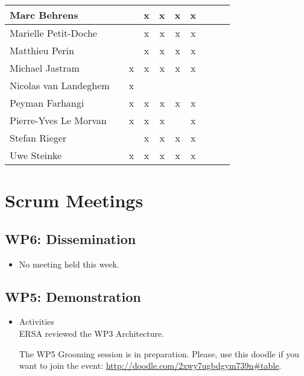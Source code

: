 \documentclass[a4paper, 11pt]{article}
\begin{document}
\begin{tabular}{|l|c|c|c||c|c|c||c|c|c|}
Marc Behrens         &   &   & x & x & x & x \\\hline
Marielle Petit-Doche &   &   & x & x & x & x \\\hline
Matthieu Perin       &   &   & x & x & x & x \\\hline
Michael Jastram      &   & x & x & x & x & x \\\hline
Nicolas van Landeghem&   & x &   &   &   &   \\\hline
Peyman Farhangi      &   & x & x & x & x & x \\\hline
Pierre-Yves Le Morvan&   & x & x & x &   & x \\\hline
Stefan Rieger        &   &   & x & x & x & x \\\hline
Uwe Steinke          &   & x & x & x & x & x \\\hline
\end{tabular}


\section{Scrum Meetings}

\subsection{WP6: Dissemination}
\begin{itemize}
\item No meeting held this week.

\end{itemize}

\subsection{WP5: Demonstration}
\begin{itemize}
\item Activities\\
ERSA reviewed the WP3 Architecture.

The WP5 Grooming session is in preparation. Please, use this doodle if you want to join the event:
\url{http://doodle.com/2xwy7ugbdgym739n#table}.

\end{itemize}
\end{document}
